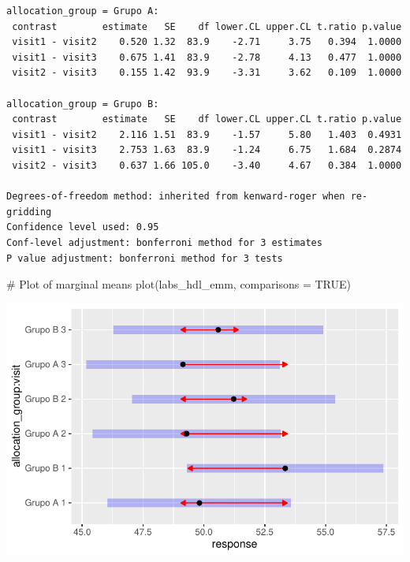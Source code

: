 \documentclass[
  letterpaper,
  DIV=11,
  numbers=noendperiod]{scrartcl}
\newenvironment{Shaded}{\begin{snugshade}}{\end{snugshade}}
\newcommand{\AttributeTok}[1]{\textcolor[rgb]{0.40,0.45,0.13}{#1}}
\newcommand{\CommentTok}[1]{\textcolor[rgb]{0.37,0.37,0.37}{#1}}
\newcommand{\ConstantTok}[1]{\textcolor[rgb]{0.56,0.35,0.01}{#1}}
\newcommand{\FunctionTok}[1]{\textcolor[rgb]{0.28,0.35,0.67}{#1}}
\newcommand{\NormalTok}[1]{\textcolor[rgb]{0.00,0.23,0.31}{#1}}
\begin{document}
\begin{verbatim}
allocation_group = Grupo A:
 contrast        estimate   SE    df lower.CL upper.CL t.ratio p.value
 visit1 - visit2    0.520 1.32  83.9    -2.71     3.75   0.394  1.0000
 visit1 - visit3    0.675 1.41  83.9    -2.78     4.13   0.477  1.0000
 visit2 - visit3    0.155 1.42  93.9    -3.31     3.62   0.109  1.0000

allocation_group = Grupo B:
 contrast        estimate   SE    df lower.CL upper.CL t.ratio p.value
 visit1 - visit2    2.116 1.51  83.9    -1.57     5.80   1.403  0.4931
 visit1 - visit3    2.753 1.63  83.9    -1.24     6.75   1.684  0.2874
 visit2 - visit3    0.637 1.66 105.0    -3.40     4.67   0.384  1.0000

Degrees-of-freedom method: inherited from kenward-roger when re-gridding 
Confidence level used: 0.95 
Conf-level adjustment: bonferroni method for 3 estimates 
P value adjustment: bonferroni method for 3 tests 
\end{verbatim}

\begin{Shaded}
\begin{Highlighting}[]
\CommentTok{\# Plot of marginal means}
\FunctionTok{plot}\NormalTok{(labs\_hdl\_emm, }\AttributeTok{comparisons =} \ConstantTok{TRUE}\NormalTok{)}
\end{Highlighting}
\end{Shaded}

\includegraphics{Outcomes_V1V2V3_files/figure-pdf/labs_hdl_sens_emm-1.pdf}
\end{document}
